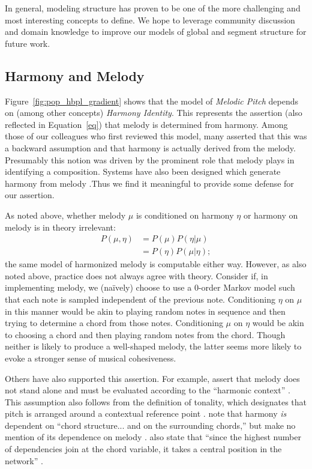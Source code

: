 \documentclass[letterpaper]{article}
\begin{document}
In general, modeling structure has proven to be one of the more challenging and most interesting concepts to define. We hope to leverage community discussion and domain knowledge to improve our models of global and segment structure for future work.

\subsection{Harmony and Melody}

Figure~\ref{fig:pop_hbpl_gradient} shows that the model of \emph{Melodic Pitch} depends on (among other concepts) \emph{Harmony Identity}. This represents the assertion (also reflected in Equation~\ref{eq}) that melody is determined from harmony. Among those of our colleagues who first reviewed this model, many asserted that this was a backward assumption and that harmony is actually derived from the melody. Presumably this notion was driven by the prominent role that melody plays in identifying a composition. Systems have also been designed which generate harmony from melody \cite{chuan2011generating}.Thus we find it meaningful to provide some defense for our assertion.

As noted above, whether melody $\mu$ is conditioned on harmony $\eta$ or harmony on melody is in theory irrelevant:
\begin{align*}
P(\mu, \eta) &= P(\mu) P(\eta|\mu) \\
&= P(\eta) P(\mu|\eta);
\end{align*}
\noindent the same model of harmonized melody is computable either way. However, as also noted above, practice does not always agree with theory. Consider if, in implementing melody, we (na\"{i}vely) choose to use a 0-order Markov model such that each note is sampled independent of the previous note. Conditioning $\eta$ on $\mu$ in this manner would be akin to playing random notes in sequence and then trying to determine a chord from those notes. Conditioning $\mu$ on $\eta$ would be akin to choosing a chord and then playing random notes from the chord. Though neither is likely to produce a well-shaped melody, the latter seems more likely to evoke a stronger sense of musical cohesiveness.

Others have also supported this assertion. For example, \citeauthor{papadopoulos1999ai} assert that melody does not stand alone and must be evaluated according to the ``harmonic context'' . This assumption also follows from the definition of tonality, which designates that pitch is arranged around a contextual reference point \cite{hyer2001}. \citeauthor{paiement2005chord} note that harmony \emph{is} dependent on ``chord structure... and on the surrounding chords,'' but make no mention of its dependence on melody . \citeauthor{dixon2010probabilistic} also state that ``since the highest number of dependencies join at the chord variable, it takes a central position in the network'' .
\end{document}
